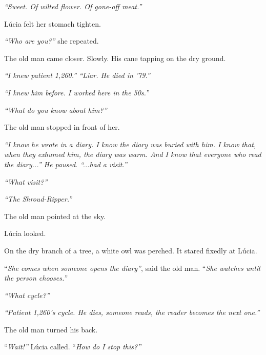 \noindent \textit{\textquotedblleft{}Sweet. Of wilted flower. Of gone-off meat.\textquotedblright{}}

\noindent Lúcia felt her stomach tighten.

\noindent \textit{\textquotedblleft{}Who are you?\textquotedblright{}} she repeated.

\noindent The old man came closer. Slowly. His cane tapping on the dry ground.

\noindent \textit{\textquotedblleft{}I knew patient 1,260.\textquotedblright{}\textit{ }\textquotedblleft{}Liar. He died in '79.\textquotedblright{}}

\noindent \textit{\textquotedblleft{}I knew him before. I worked here in the 50s.\textquotedblright{}}

\noindent \textit{\textquotedblleft{}What do you know about him?\textquotedblright{}}

\noindent The old man stopped in front of her.

\noindent \textit{\textquotedblleft{}I know he wrote in a diary. I know the diary was buried with him. I know that, when they exhumed him, the diary was warm. And I know that everyone who read the diary...\textquotedblright{}\textit{ He paused. }\textquotedblleft{}...had a visit.\textquotedblright{}}

\noindent \textit{\textquotedblleft{}What visit?\textquotedblright{}}

\noindent \textit{\textquotedblleft{}The Shroud-Ripper.\textquotedblright{}}

\noindent The old man pointed at the sky.

\noindent Lúcia looked.

\noindent On the dry branch of a tree, a white owl was perched. It stared fixedly at Lúcia.

\noindent \textquotedblleft{\textit{She comes when someone opens the diary\textquotedblright{}}, said the old man. }\textquotedblleft{\textit{She watches until the person chooses.\textquotedblright{}}}

\noindent \textit{\textquotedblleft{}What cycle?\textquotedblright{}}

\noindent \textit{\textquotedblleft{}Patient 1,260's cycle. He dies, someone reads, the reader becomes the next one.\textquotedblright{}}

\noindent The old man turned his back.

\noindent \textquotedblleft{\textit{Wait!\textquotedblright{}} Lúcia called. }\textquotedblleft{\textit{How do I stop this?\textquotedblright{}}}

